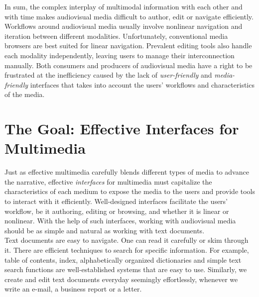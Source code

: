 In sum, the complex interplay of multimodal information with each other and with time makes audiovisual media difficult to author, edit or navigate efficiently. Workflows around audiovisual media usually involve nonlinear navigation and iteration between different modalities. Unfortunately, conventional media browsers are best suited for linear navigation. Prevalent editing tools also handle each modality independently, leaving users to manage their interconnection manually. Both consumers and producers of audiovisual media have a right to be frustrated at the inefficiency caused by the lack of \emph{user-friendly} and \emph{media-friendly} interfaces that takes into account the users' workflows and characteristics of the media.\\ 
%
\section{The Goal: Effective Interfaces for Multimedia}
Just as effective multimedia carefully blends different types of media to advance the narrative, effective \textit{interfaces} for multimedia must capitalize the characteristics of each medium to expose the media to the users and provide tools to interact with it efficiently. Well-designed interfaces facilitate the users' workflow, be it authoring, editing or browsing, and whether it is linear or nonlinear. With the help of such interfaces, working with audiovisual media should be as simple and natural as working with text documents.\\

Text documents are easy to navigate. One can read it carefully or skim through it. There are efficient techniques to search for specific information. For example, table of contents, index, alphabetically organized dictionaries and simple text search functions are well-established systems that are easy to use. Similarly, we create and edit text documents everyday seemingly effortlessly, whenever we write an e-mail, a business report or a letter.\\

